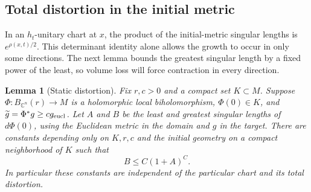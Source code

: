 \documentclass[11pt]{article}
\newtheorem{lemma}[theorem]{Lemma}
\theoremstyle{definition}
\theoremstyle{remark}
\newcommand{\C}{\mathbb C}
\numberwithin{equation}{section}
\begin{document}
\subsection{Total distortion in the initial metric}

In an $h_t$-unitary chart at $x$, the product of the initial-metric
singular lengths is $e^{\rho(x,t)/2}$.  This determinant identity alone
allows the growth to occur in only some directions.  The next lemma
bounds the greatest singular length by a fixed power of the least,
so volume loss will force contraction in every direction.

\begin{lemma}[Static distortion]\label{lem:static-distortion}
Fix $r,c>0$ and a compact set $K\subset M$.  Suppose
$\Phi:B_{\C^n}(r)\to M$ is a holomorphic local biholomorphism,
$\Phi(0)\in K$, and $\widetilde g=\Phi^*g\ge c g_{\rm eucl}$.
Let $A$ and $B$ be the least and greatest singular lengths of
$d\Phi(0)$, using the Euclidean metric in the domain and $g$ in
the target.  There are constants depending only on $K,r,c$ and
the initial geometry on a compact neighborhood of $K$ such that
\begin{equation}\label{chart:static-distortion}
 B\le C(1+A)^C.
\end{equation}
In particular these constants are independent of the particular
chart and its total distortion.
\end{lemma}
\end{document}
